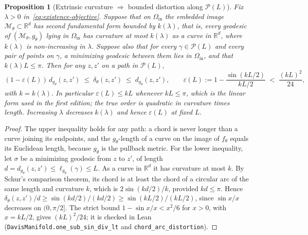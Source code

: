 \documentclass[11pt]{article}
\newcommand{\RR}{\mathbb{R}}
\newtheorem{proposition}{Proposition}
\theoremstyle{remark}
\theoremstyle{plain}
\begin{document}
\begin{proposition}[Extrinsic curvature $\Rightarrow$ bounded distortion along $\mathcal{P}(L)$]
\label{prop:smoothness-distortion}
Fix $\lambda > 0$ in~\eqref{eq:existence-objective}. Suppose that on $\Omega_{\mathrm{in}}$ the embedded
image $\mathcal{M}_\theta \subset \RR^d$ has second fundamental form bounded by $k(\lambda)$, that is,
every geodesic of $(\mathcal{M}_\theta, g_\theta)$ lying in $\Omega_{\mathrm{in}}$ has curvature at most
$k(\lambda)$ as a curve in $\RR^d$, where $k(\lambda)$ is non-increasing in $\lambda$. Suppose also that
for every $\gamma\in\mathcal{P}(L)$ and every pair of points on $\gamma$, a minimizing geodesic between them
lies in $\Omega_{\mathrm{in}}$, and that $k(\lambda) L \le \pi$. Then for any $z,z'$ on a path in $\mathcal{P}(L)$,
\begin{equation}
\label{eq:distortion-epsL}
(1 - \varepsilon(L)) \, d_{g_\theta}(z,z')
\;\le\;
\delta_\theta(z,z')
\;\le\;
d_{g_\theta}(z,z'),
\qquad
\varepsilon(L) := 1 - \frac{\sin(kL/2)}{kL/2} \;<\; \frac{(kL)^2}{24},
\end{equation}
with $k = k(\lambda)$. In particular $\varepsilon(L) \le kL$ whenever $kL \le \pi$, which is the linear form used
in the first edition; the true order is quadratic in curvature times length. Increasing $\lambda$ decreases
$k(\lambda)$ and hence $\varepsilon(L)$ at fixed $L$.
\end{proposition}

\begin{proof}
The upper inequality holds for any path: a chord is never longer than a curve joining its endpoints, and
the $g_\theta$-length of a curve on the image of $f_\theta$ equals its Euclidean length, because $g_\theta$ is
the pullback metric. For the lower inequality, let $\sigma$ be a minimizing geodesic from $z$ to $z'$, of
length $d = d_{g_\theta}(z,z') \le \ell_{g_\theta}(\gamma) \le L$. As a curve in $\RR^d$ it has curvature at most
$k$. By Schur's comparison theorem, its chord is at least the chord of a circular arc of the same length
and curvature $k$, which is $2\sin(kd/2)/k$, provided $kd \le \pi$. Hence
$\delta_\theta(z,z')/d \ge \sin(kd/2)/(kd/2) \ge \sin(kL/2)/(kL/2)$, since $\sin x / x$ decreases on $(0,\pi/2]$.
The strict bound $1 - \sin x/x < x^2/6$ for $x>0$, with $x = kL/2$, gives $(kL)^2/24$; it is checked in Lean
(\texttt{DavisManifold.one\_sub\_sin\_div\_lt} and \texttt{chord\_arc\_distortion}).
\end{proof}
\end{document}
